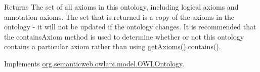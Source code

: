 \begin{DoxyReturn}{Returns}
The set of all axioms in this ontology, including logical axioms and annotation axioms. The set that is returned is a copy of the axioms in the ontology -\/ it will not be updated if the ontology changes. It is recommended that the {\ttfamily contains\-Axiom} method is used to determine whether or not this ontology contains a particular axiom rather than using \hyperlink{classuk_1_1ac_1_1manchester_1_1cs_1_1owl_1_1owlapi_1_1_o_w_l_ontology_impl_a0244a8caaf5beb560fe0c9b93cceb956}{get\-Axioms()}.contains(). 
\end{DoxyReturn}


Implements \hyperlink{interfaceorg_1_1semanticweb_1_1owlapi_1_1model_1_1_o_w_l_ontology_a650a728c2c12af706c91914d82bed2a1}{org.\-semanticweb.\-owlapi.\-model.\-O\-W\-L\-Ontology}.

